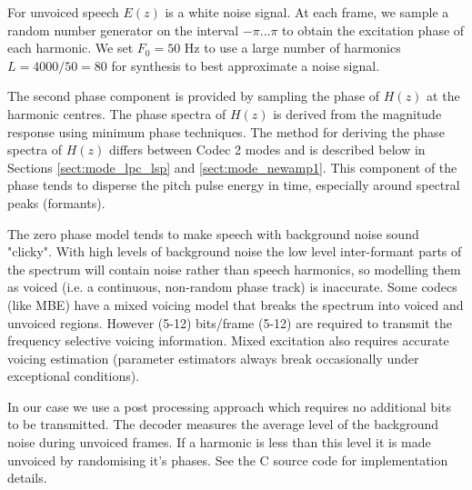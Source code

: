 \documentclass{article}
\begin{document}
{For unvoiced speech $E(z)$ is a white noise signal.  At each frame, we sample a random number generator on the interval $-\pi ... \pi$ to obtain the excitation phase of each harmonic.  We set $F_0 = 50$ Hz to use a large number of harmonics $L=4000/50=80$ for synthesis to best approximate a noise signal.

The second phase component is provided by sampling the phase of $H(z)$ at the harmonic centres.  The phase spectra of $H(z)$ is derived from the magnitude response using minimum phase techniques.  The method for deriving the phase spectra of $H(z)$ differs between Codec 2 modes and is described below in Sections \ref{sect:mode_lpc_lsp} and \ref{sect:mode_newamp1}.  This component of the phase tends to disperse the pitch pulse energy in time, especially around spectral peaks (formants).

The zero phase model tends to make speech with background noise sound "clicky".  With high levels of background noise the low level inter-formant parts of the spectrum will contain noise rather than speech harmonics, so modelling them as voiced (i.e. a continuous, non-random phase track) is inaccurate. Some codecs (like MBE) have a mixed voicing model that breaks the spectrum into voiced and unvoiced regions.  However (5-12) bits/frame (5-12) are required to transmit the frequency selective voicing information.  Mixed excitation also requires accurate voicing estimation (parameter estimators always break occasionally under exceptional conditions).

In our case we use a post processing approach which requires no additional bits to be transmitted.  The decoder measures the average level of the background noise during unvoiced frames.  If a harmonic is less than this level it is made unvoiced by randomising it's phases.  See the C source code for implementation details.

}
\end{document}
